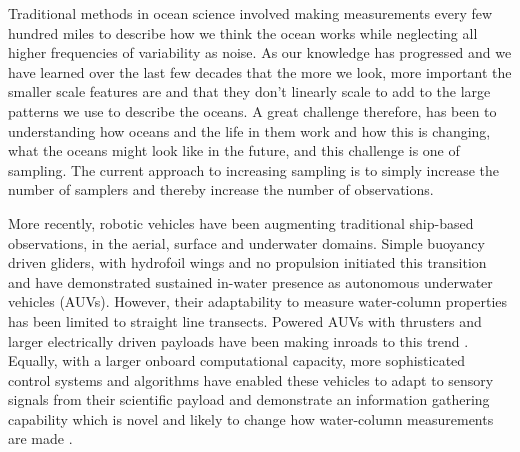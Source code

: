 

Traditional methods in ocean science involved making measurements
every few hundred miles to describe how we think the ocean works while
neglecting all higher frequencies of variability as noise.  As our
knowledge has progressed and we have learned over the last few decades
that the more we look, more important the smaller scale features are
and that they don't linearly scale to add to the large patterns we
use to describe the oceans. A great challenge therefore, has been to
understanding how oceans and the life in them work and how this is
changing, what the oceans might look like in the future, and this
challenge is one of sampling.  The current approach to increasing
sampling is to simply increase the number of samplers and thereby
increase the number of observations.

More recently, robotic vehicles have been augmenting traditional
ship-based observations, in the aerial, surface and underwater
domains. Simple buoyancy driven gliders, with hydrofoil wings and no
propulsion initiated this transition and have demonstrated sustained
in-water presence \cite{rucool11} as autonomous underwater vehicles
(AUVs). However, their adaptability to measure water-column properties
has been limited to straight line transects. Powered AUVs with
thrusters and larger electrically driven payloads have been making
inroads to this trend \cite{loch89,dorado2004,Bellingham07}. Equally,
with a larger onboard computational capacity, more sophisticated
control systems and algorithms have enabled these vehicles to adapt to
sensory signals from their scientific payload and demonstrate an
information gathering capability which is novel and likely to change
how water-column measurements are made
\cite{bellingham94,aosn93,ryan10,das11b,das15,fossum18,fossum18b}.

